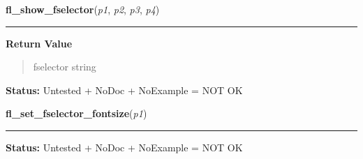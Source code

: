     \label{xformslib:library:fl_show_fselector}

    \vspace{0.5ex}

\hspace{.8\funcindent}\begin{boxedminipage}{\funcwidth}

    \raggedright \textbf{fl\_show\_fselector}(\textit{p1}, \textit{p2}, \textit{p3}, \textit{p4})

    \vspace{-1.5ex}

    \rule{\textwidth}{0.5\fboxrule}
\setlength{\parskip}{2ex}
\setlength{\parskip}{1ex}
      \textbf{Return Value}
    \vspace{-1ex}

      \begin{quote}
      fselector string

      \end{quote}

\textbf{Status:} Untested + NoDoc + NoExample = NOT OK



    \end{boxedminipage}

    \label{xformslib:library:fl_set_fselector_fontsize}

    \vspace{0.5ex}

\hspace{.8\funcindent}\begin{boxedminipage}{\funcwidth}

    \raggedright \textbf{fl\_set\_fselector\_fontsize}(\textit{p1})

    \vspace{-1.5ex}

    \rule{\textwidth}{0.5\fboxrule}
\setlength{\parskip}{2ex}
\setlength{\parskip}{1ex}
\textbf{Status:} Untested + NoDoc + NoExample = NOT OK



    \end{boxedminipage}

    \label{xformslib:library:fl_set_fselector_fontstyle}


